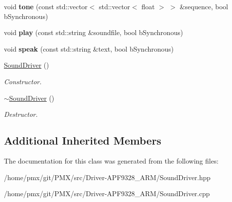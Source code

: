 \begin{DoxyCompactItemize}
void {\bfseries tone} (const std\+::vector$<$ std\+::vector$<$ float $>$ $>$ \&sequence, bool b\+Synchronous)
\item 
\mbox{\label{classSoundDriver_afd64ca3d517d01947d514eb689027eea}} 
void {\bfseries play} (const std\+::string \&soundfile, bool b\+Synchronous)
\item 
\mbox{\label{classSoundDriver_a44869623a4c7ad03e9a65388647bc10c}} 
void {\bfseries speak} (const std\+::string \&text, bool b\+Synchronous)
\item 
\mbox{\label{classSoundDriver_aa45970b1e9155eb51a155cc7ef4389dc}} 
\hyperlink{classSoundDriver_aa45970b1e9155eb51a155cc7ef4389dc}{Sound\+Driver} ()
\begin{DoxyCompactList}\small\item\em Constructor. \end{DoxyCompactList}\item 
\mbox{\label{classSoundDriver_a45845cb8587a626a4ab6a2c53dcdf7c0}} 
\hyperlink{classSoundDriver_a45845cb8587a626a4ab6a2c53dcdf7c0}{$\sim$\+Sound\+Driver} ()
\begin{DoxyCompactList}\small\item\em Destructor. \end{DoxyCompactList}\end{DoxyCompactItemize}
\subsection*{Additional Inherited Members}


The documentation for this class was generated from the following files\+:\begin{DoxyCompactItemize}
\item 
/home/pmx/git/\+P\+M\+X/src/\+Driver-\/\+A\+P\+F9328\+\_\+\+A\+R\+M/Sound\+Driver.\+hpp\item 
/home/pmx/git/\+P\+M\+X/src/\+Driver-\/\+A\+P\+F9328\+\_\+\+A\+R\+M/Sound\+Driver.\+cpp\end{DoxyCompactItemize}
